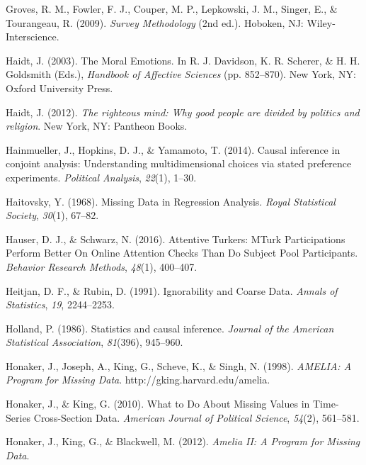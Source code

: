 \documentclass[12pt,econ]{sources/authesis}
\begin{document}
\leavevmode\hypertarget{ref-groves_survey_2009}{}%
Groves, R. M., Fowler, F. J., Couper, M. P., Lepkowski, J. M., Singer, E., \& Tourangeau, R. (2009). \emph{Survey Methodology} (2nd ed.). Hoboken, NJ: Wiley-Interscience.

\leavevmode\hypertarget{ref-haidt_moral_2003}{}%
Haidt, J. (2003). The Moral Emotions. In R. J. Davidson, K. R. Scherer, \& H. H. Goldsmith (Eds.), \emph{Handbook of Affective Sciences} (pp. 852--870). New York, NY: Oxford University Press.

\leavevmode\hypertarget{ref-haidt_2012_righteous}{}%
Haidt, J. (2012). \emph{The righteous mind: Why good people are divided by politics and religion}. New York, NY: Pantheon Books.

\leavevmode\hypertarget{ref-hainmueller_2014_causal}{}%
Hainmueller, J., Hopkins, D. J., \& Yamamoto, T. (2014). Causal inference in conjoint analysis: Understanding multidimensional choices via stated preference experiments. \emph{Political Analysis}, \emph{22}(1), 1--30.

\leavevmode\hypertarget{ref-haitovsky_1968_missing}{}%
Haitovsky, Y. (1968). Missing Data in Regression Analysis. \emph{Royal Statistical Society}, \emph{30}(1), 67--82.

\leavevmode\hypertarget{ref-hauser_attentive_2016}{}%
Hauser, D. J., \& Schwarz, N. (2016). Attentive Turkers: MTurk Participations Perform Better On Online Attention Checks Than Do Subject Pool Participants. \emph{Behavior Research Methods}, \emph{48}(1), 400--407.

\leavevmode\hypertarget{ref-heitjan_1991_ignorability}{}%
Heitjan, D. F., \& Rubin, D. (1991). Ignorability and Coarse Data. \emph{Annals of Statistics}, \emph{19}, 2244--2253.

\leavevmode\hypertarget{ref-holland_1986_statistics}{}%
Holland, P. (1986). Statistics and causal inference. \emph{Journal of the American Statistical Association}, \emph{81}(396), 945--960.

\leavevmode\hypertarget{ref-honaker_1998_amelia}{}%
Honaker, J., Joseph, A., King, G., Scheve, K., \& Singh, N. (1998). \emph{AMELIA: A Program for Missing Data}. http://gking.harvard.edu/amelia.

\leavevmode\hypertarget{ref-honaker_2010_what}{}%
Honaker, J., \& King, G. (2010). What to Do About Missing Values in Time-Series Cross-Section Data. \emph{American Journal of Political Science}, \emph{54}(2), 561--581.

\leavevmode\hypertarget{ref-honaker_2012_amelia}{}%
Honaker, J., King, G., \& Blackwell, M. (2012). \emph{Amelia II: A Program for Missing Data}.
\end{document}

